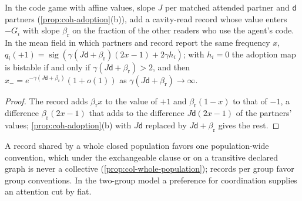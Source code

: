 \begin{proposition}\label{prop:hie-record-bistability}
In the code game with affine values, slope $J$ per matched attended partner and $\mathsf d$ partners (\cref{prop:coh-adoption}(b)), add a cavity-read record whose value enters $-G_i$ with slope $\beta_{\mathrm r}$ on the fraction of the other readers who use the agent's code. In the mean field in which partners and record report the same frequency $x$, $q_i(+1)=\operatorname{sig}(\gamma(J\mathsf d+\beta_{\mathrm r})(2x-1)+2\gamma h_i)$; with $h_i=0$ the adoption map is bistable if and only if $\gamma(J\mathsf d+\beta_{\mathrm r})>2$, and then $x_-=e^{-\gamma(J\mathsf d+\beta_{\mathrm r})}(1+o(1))$ as $\gamma(J\mathsf d+\beta_{\mathrm r})\to\infty$.
\end{proposition}

\begin{proof}
The record adds $\beta_{\mathrm r}x$ to the value of $+1$ and $\beta_{\mathrm r}(1-x)$ to that of $-1$, a difference $\beta_{\mathrm r}(2x-1)$ that adds to the difference $J\mathsf d(2x-1)$ of the partners' values; \cref{prop:coh-adoption}(b) with $J\mathsf d$ replaced by $J\mathsf d+\beta_{\mathrm r}$ gives the rest.
\end{proof}

A record shared by a whole closed population favors one population-wide convention, which under the exchangeable clause or on a transitive declared graph is never a collective (\cref{prop:col-whole-population}); records per group favor group conventions. In the two-group model a preference for coordination supplies an attention cut by fiat.

